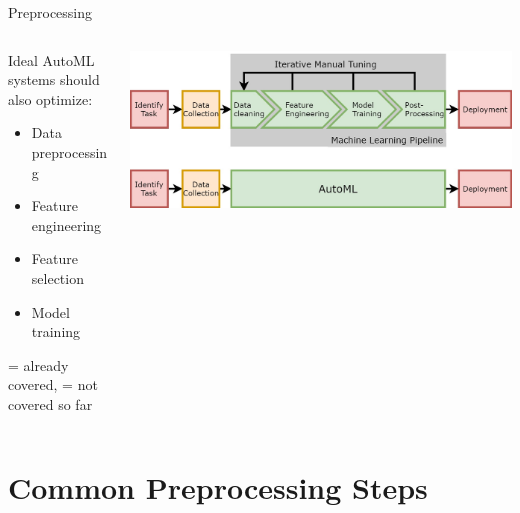 \begin{frame}{Preprocessing}
  \begin{columns}
    \begin{column}{0.5\textwidth} 
      Ideal AutoML systems should also optimize: 
      \begin{itemize}
        \item[\ding{55}] Data preprocessing
        \item[\ding{55}] Feature engineering
        \item[\ding{55}] Feature selection
        \item[\ding{51}] Model training
      \end{itemize}
      \vspace{10em}
      {\tiny {} = already covered,  = not covered so far}
    \end{column}%
    \begin{column}{0.5\textwidth}
      \begin{center}
        \includegraphics[width = \linewidth]{images/AutoMLPipeline.jpg}  
      \end{center}
    \end{column}
  \end{columns}
  
\end{frame}

\section{Common Preprocessing Steps}

